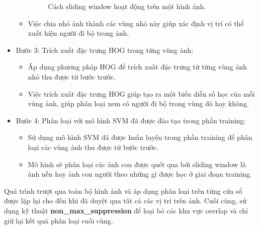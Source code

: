 \begin{itemize}[noitemsep, topsep=0pt, leftmargin=1.25em ]
\begin{itemize}[noitemsep, topsep=0pt, leftmargin=1.5em, label={$-$}]
\begin{figure}[h!]
                  \caption{Cách sliding window hoạt động trên một hình ảnh.}
                \end{figure}
            \item Việc chia nhỏ ảnh thành các vùng nhỏ này giúp xác định vị trí có thể xuất hiện người đi bộ trong ảnh.
        \end{itemize}
    \item Bước 3: Trích xuất đặc trưng HOG trong từng vùng ảnh:
    \begin{itemize}[noitemsep, topsep=0pt, leftmargin=1.5em, label={$-$}]
        \item Áp dụng phương pháp HOG để trích xuất đặc trưng từ từng vùng ảnh nhỏ thu được từ bước trước.
        \item Việc trích xuất đặc trưng HOG giúp tạo ra một biểu diễn số học của mỗi vùng ảnh, giúp phân loại xem có người đi bộ trong vùng đó hay không.
    \end{itemize}
    \item Bước 4: Phân loại với mô hình SVM đã được đào tạo trong phần training:
    \begin{itemize}[noitemsep, topsep=0pt, leftmargin=1.5em, label={$-$}]
        \item Sử dụng mô hình SVM đã được huấn luyện trong phần training để phân loại các vùng ảnh thu được từ bước trước. 
        \item Mô hình sẽ phân loại các ảnh con được quét qua bởi sliding window là ảnh nền hay ảnh con người theo những gì được học ở giai đoạn training.
    \end{itemize}
\end{itemize}
Quá trình trượt qua toàn bộ hình ảnh và áp dụng phân loại trên từng cửa sổ được lặp lại cho đến khi đã duyệt qua tất cả các vị trí trên ảnh. Cuối cùng, sử dụng kỹ thuật \textbf{non\_max\_suppression} để loại bỏ các khu vực overlap và chỉ giữ lại kết quả phân loại cuối cùng.

